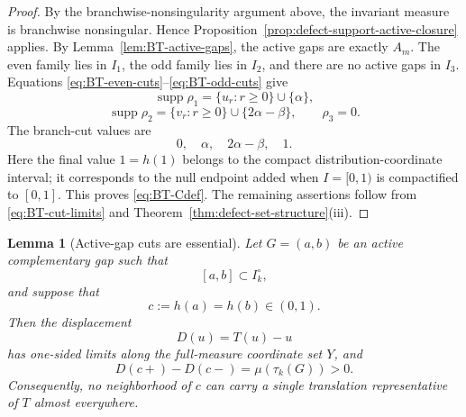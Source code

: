 \documentclass[11pt]{amsart}
\theoremstyle{plain}
\newtheorem{lemma}[theorem]{Lemma}
\theoremstyle{definition}
\theoremstyle{remark}
\DeclareMathOperator{\supp}{supp}
\begin{document}
\begin{proof}
By the branchwise-nonsingularity argument above, the invariant measure is branchwise
nonsingular. Hence
Proposition~\ref{prop:defect-support-active-closure} applies. By
Lemma~\ref{lem:BT-active-gaps}, the active gaps are exactly \(A_m\). The even family lies in
\(I_1\), the odd family lies in \(I_2\), and there are no active gaps in \(I_3\). Equations
\eqref{eq:BT-even-cuts}--\eqref{eq:BT-odd-cuts} give
\[
\supp\rho_1=\{u_r:r\geq0\}\cup\{\alpha\},
\]
\[
\supp\rho_2=\{v_r:r\geq0\}\cup\{2\alpha-\beta\},
\qquad
\rho_3=0.
\]
The branch-cut values are
\[
        0,
        \quad
        \alpha,
        \quad
        2\alpha-\beta,
        \quad
        1.
\]
Here the final value \(1=h(1)\) belongs to the compact distribution-coordinate interval;
it corresponds to the null endpoint added when \(I=[0,1)\) is compactified to \([0,1]\).
This proves \eqref{eq:BT-Cdef}. The remaining assertions follow from
\eqref{eq:BT-cut-limits} and Theorem~\ref{thm:defect-set-structure}\textup{(iii)}.
\end{proof}

\begin{lemma}[Active-gap cuts are essential]\label{lem:active-gap-essential-cut}
Let \(G=(a,b)\) be an active complementary gap such that
\[
        [a,b]\subset I_k^\circ,
\]
and suppose that
\[
        c:=h(a)=h(b)\in(0,1).
\]
Then the displacement
\[
        D(u)=T(u)-u
\]
has one-sided limits along the full-measure coordinate set \(Y\), and
\[
        D(c+)-D(c-)=\mu(\tau_k(G))>0.
\]
Consequently, no neighborhood of \(c\) can carry a single translation representative of
\(T\) almost everywhere.
\end{lemma}
\end{document}
